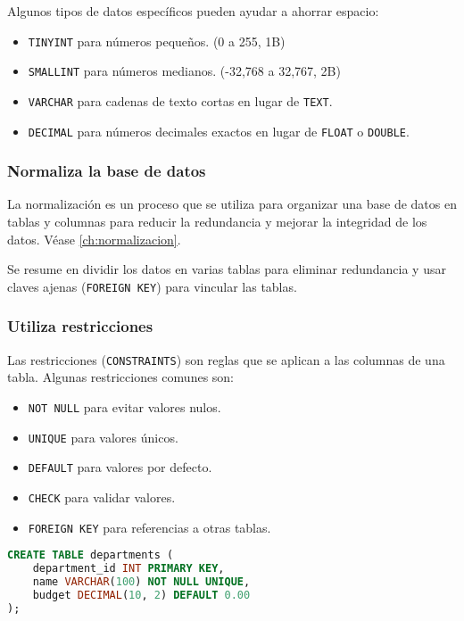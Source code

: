 Algunos tipos de datos específicos pueden ayudar a ahorrar espacio:
\begin{itemize}
    \item \texttt{TINYINT} para números pequeños. (0 a 255, 1B)
    \item \texttt{SMALLINT} para números medianos. (-32,768 a 32,767, 2B)
    \item \texttt{VARCHAR} para cadenas de texto cortas en lugar de \texttt{TEXT}.
    \item \texttt{DECIMAL} para números decimales exactos en lugar de \texttt{FLOAT} o \texttt{DOUBLE}. \cite{decimalVsFloat}
\end{itemize}

\subsubsection{Normaliza la base de datos}

La normalización es un proceso que se utiliza para organizar
una base de datos en tablas y columnas para reducir la redundancia
y mejorar la integridad de los datos. Véase \ref{ch:normalizacion}.

Se resume en dividir los datos en varias tablas para eliminar
redundancia y usar claves ajenas (\texttt{FOREIGN KEY}) para
vincular las tablas.

\subsubsection{Utiliza restricciones}

Las restricciones (\texttt{CONSTRAINTS}) son reglas que se
aplican a las columnas de una tabla. Algunas restricciones
comunes son:

\begin{itemize}
    \item \texttt{NOT NULL} para evitar valores nulos.
    \item \texttt{UNIQUE} para valores únicos.
    \item \texttt{DEFAULT} para valores por defecto.
    \item \texttt{CHECK} para validar valores.
    \item \texttt{FOREIGN KEY} para referencias a otras tablas.
\end{itemize}

\begin{lstlisting}[language=SQL]
CREATE TABLE departments (
    department_id INT PRIMARY KEY,
    name VARCHAR(100) NOT NULL UNIQUE,
    budget DECIMAL(10, 2) DEFAULT 0.00
);
\end{lstlisting}


